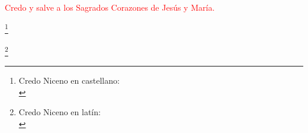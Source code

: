 \documentclass[10pt,twoside]{book}
\begin{document}
\textcolor{red}{Credo y salve a los Sagrados Corazones de Jesús y María.}
\vspace{0.2em}
\begin{paracol}{2}
      \begin{leftcolumn}
            \footnote{Credo Niceno en castellano:\\ \indent}
      \end{leftcolumn}
      \begin{otherlanguage}{latin}
            \begin{rightcolumn}
                  \footnote{Credo Niceno en latín:\\ \indent}
            \end{rightcolumn}
      \end{otherlanguage}


      \begin{leftcolumn*}
            
      \end{leftcolumn*}
      \begin{otherlanguage}{latin}
            \begin{rightcolumn}
                  
            \end{rightcolumn}
      \end{otherlanguage}

      \begin{leftcolumn*}
            
      \end{leftcolumn*}
      \begin{otherlanguage}{latin}
            \begin{rightcolumn}
                  
            \end{rightcolumn}
      \end{otherlanguage}

      \begin{leftcolumn*}
            
      \end{leftcolumn*}
      \begin{otherlanguage}{latin}
            \begin{rightcolumn}
                  
            \end{rightcolumn}
      \end{otherlanguage}


\end{paracol}
\end{document}
